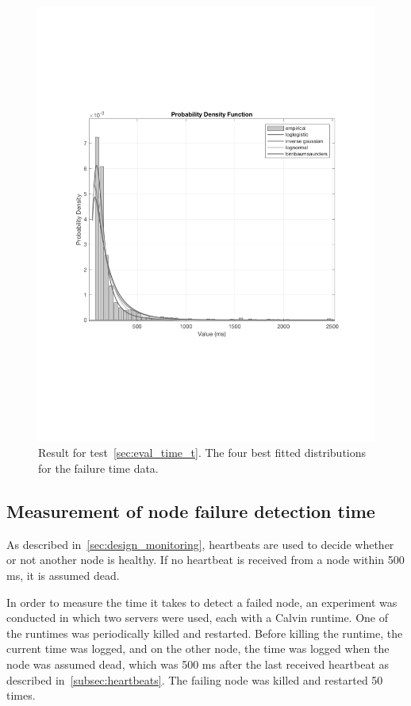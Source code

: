 \documentclass{cslthse-msc}
\begin{document}
\begin{figure}[!hbt]
\centering
\includegraphics[scale=0.5]{images/results/distribution_results.pdf} 
\caption{Result for test~\ref{sec:eval_time_t}. The four best fitted distributions for the failure time data.}\label{fig:distribution_results}
\end{figure} 

\subsection{Measurement of node failure detection time} \label{subsec:eval_node_fail_time}
As described in~\cref{sec:design_monitoring}, heartbeats are used to decide whether or not another node is healthy. If no heartbeat is received from a node within 500 ms, it is assumed dead. 

In order to measure the time it takes to detect a failed node, an experiment was conducted in which two servers were used, each with a Calvin runtime. One of the runtimes was periodically killed and restarted. Before killing the runtime, the current time was logged, and on the other node, the time was logged when the node was assumed dead, which was 500 ms after the last received heartbeat as described in~\cref{subsec:heartbeats}. The failing node was killed and restarted 50 times.
\end{document}
